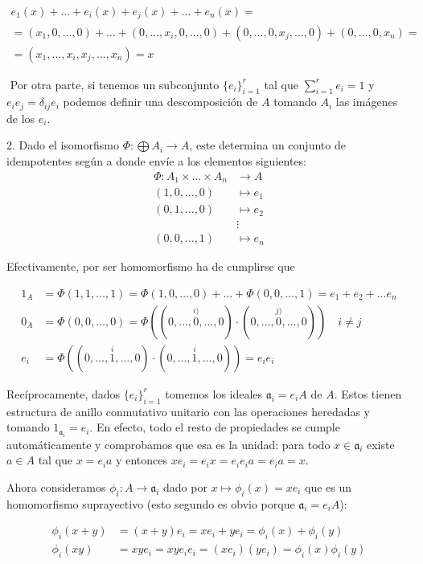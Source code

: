 \documentclass[../main.tex]{subfiles}
\begin{document}
\begin{multline}
e_1(x)+\ldots+e_i(x)+e_j(x)+\ldots +e_n(x)=\\=(x_1,0,\dots,0)+\dots+(0,\dots,x_i,0,\dots,0)+(0,\dots,0,x_j,\dots,0)+ (0,\dots,0,x_n) =\\= (x_1,\dots,x_i,x_j,\dots,x_n) = x
\end{multline}

​	Por otra parte, si tenemos un subconjunto $\{e_i\}_{i=1}^r$ tal que  $\sum_{i=1}^r e_i = 1$ y $e_ie_j=\delta_{ij}e_i$ podemos definir una descomposición de 	$A$ tomando $A_i$ las imágenes de los $e_i$.

2. Dado el isomorfismo $\Phi:\bigoplus A_i \to A$, este determina un conjunto de idempotentes según a donde envíe a los elementos siguientes:
\begin{align*}
\Phi: A_1\times\ldots \times A_n &\to A\\
(1,0,\dots,0)&\mapsto e_1\\
(0,1,\dots,0)&\mapsto e_2\\
&\vdots\\
(0,0,\dots,1)&\mapsto e_n
\end{align*}

Efectivamente, por ser homomorfismo ha de cumplirse que

\begin{align}
   1_A&=\Phi(1,1,\dots,1) = \Phi(1,0,\ldots,0)+\dots+\Phi(0,0,\ldots, 1) = e_1+e_2+\ldots e_n\\
   0_A &= \Phi(0,0,\dots,0) = \Phi((0,\dots,\overset{i)}{0},\dots,0)\cdot (0,\dots,\overset{j)}{0},\dots,0)) \quad i\neq j\\
   e_i &= \Phi((0,\dots,\overset{i}{1},\ldots,0)\cdot(0,\dots,\overset{i}{1},\ldots,0)) = e_ie_i
\end{align}

Recíprocamente, dados $\{e_i\}_{i=1}^r$ tomemos los ideales $\mathfrak a_i =e_iA$ de $A$. Estos tienen estructura de anillo conmutativo unitario con las operaciones heredadas y tomando $1_{\mathfrak a_i} = e_i$. En efecto, todo el resto de propiedades se cumple automáticamente y comprobamos que esa es la unidad: para todo $x\in \mathfrak a_i$ existe $a\in A$ tal que $x=e_ia$ y entonces $xe_i = e_ix = e_i e_i a = e_i a = x$.

Ahora consideramos $\phi_i:A\to \mathfrak a_i$ dado por $x\mapsto\phi_i(x) = xe_i$ que es un homomorfismo suprayectivo (esto segundo es obvio porque $\mathfrak a_i = e_iA$):

\begin{align}
    \phi_i(x+y) &= (x+y)e_i = xe_i+ye_i = \phi_i(x)+\phi_i(y)\\
\phi_i(xy) &= xye_i = xye_ie_i = (xe_i)(ye_i) = \phi_i(x)\phi_i(y)
\end{align}
\end{document}
